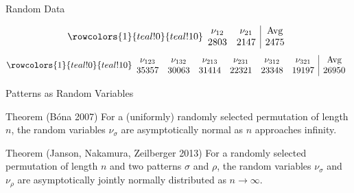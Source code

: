\documentclass[xcolor=table,dvipsnames]{beamer}
\newcommand{\num}{\nu}
\newcommand{\sg}{\sigma}
\begin{document}
  \begin{frame}{Random Data}
    \begin{center}
    \end{center}

    \vspace{-1pc}

    
    \pause
    $$
    \rowcolors{1}{teal!0}{teal!10}
    \begin{array}{cc|c}
      \num_{12} &\num_{21} & \text{Avg}\\
      2803 & 2147 & 2475
    \end{array}
    $$
    \pause
    $$
    \rowcolors{1}{teal!0}{teal!10}
    \begin{array}{cccccc|c}
      \num_{123} &\num_{132} &\num_{213} &\num_{231} 
        &\num_{312} &\num_{321} & \text{Avg}\\
      35357 & 30063 & 31414 & 22321 & 23348 & 19197 & 26950
    \end{array}
    $$

  \end{frame}


  \begin{frame}{Patterns as Random Variables}
    \begin{block}{Theorem (B\'ona 2007)}
      For a (uniformly) randomly selected permutation of length $n$, 
      the random variables $\num_{\sg}$ are asymptotically normal as $n$
      approaches infinity.
    \end{block}

    \begin{block}{Theorem (Janson, Nakamura, Zeilberger 2013)}
      For a randomly selected permutation of length $n$ and two patterns $\sg$
      and $\rho$, the random variables $\num_{\sg}$ and $\num_{\rho}$ are
      asymptotically jointly normally distributed as $n \rightarrow \infty$. 
    \end{block}
  \end{frame}
\end{document}
